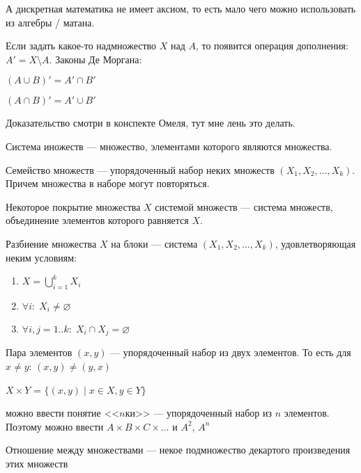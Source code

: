 А дискретная математика не имеет аксиом, то есть мало чего можно использовать из алгебры / матана. 

Если задать какое-то надмножество $X$ над $A$, то появится операция дополнения:  $A' = X \setminus A$.
Законы Де Моргана:
\begin{theorem}
    $(A \cup B)' = A' \cap B'$
\end{theorem}
\begin{theorem}
    $(A \cap B)' = A' \cup B'$
\end{theorem}

Доказательство смотри в конспекте Омеля, тут мне лень это делать.

\begin{definition}
    Система иножеств --- множество, элементами которого являются множества.
\end{definition}
\begin{definition}
    Семейство множеств --- упорядоченный набор неких множеств $(X_1, X_2,\ldots, X_k)$. Причем множества в наборе могут повторяться.
\end{definition}
\begin{definition}
    Некоторое покрытие множества $X$ системой множеств --- система множеств, объединение элементов которого равняется $X$.
\end{definition}
\begin{definition}
    Разбиение множества $X$ на блоки --- система $(X_1,X_2,\ldots,X_k)$, удовлетворяющая неким условиям:
     \begin{enumerate}
         \item $X = \bigcup_{i = 1}^k X_i$
         \item $\forall i: \; X_i \neq \varnothing$
         \item  $\forall i, j = 1..k: \; X_i \cap X_j = \varnothing$
    \end{enumerate}
\end{definition}
\begin{definition}
    Пара элементов $(x,y)$ --- упорядоченный набор из двух элементов. То есть для $x \neq y$:  $(x, y) \neq (y,x)$
\end{definition}
\begin{definition}
    $X \times Y$ =  $\{ (x, y) \; \vert \; x \in X, y \in Y \}$
\end{definition}
можно ввести понятие <<$n$ки>> --- упорядоченный набор из $n$ элементов. Поэтому можно ввести $A \times B \times C \times \ldots$ и $A^2$,  $A^n$
\begin{definition}
    Отношение между множествами --- некое подмножество декартого произведения этих множеств
\end{definition}
